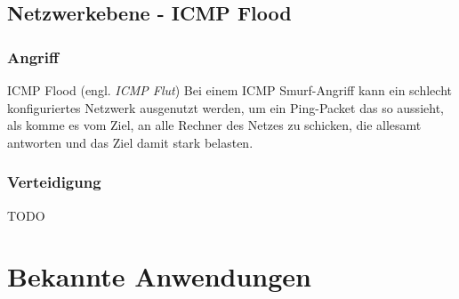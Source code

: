 \documentclass[12pt,a4paper]{article}
\begin{document}
\subsection{Netzwerkebene - ICMP Flood}
\subsubsection*{Angriff}
ICMP Flood (engl. \textit{ICMP Flut}) Bei einem ICMP Smurf-Angriff kann ein schlecht konfiguriertes Netzwerk ausgenutzt werden, um ein Ping-Packet das so aussieht, als komme es vom Ziel, an alle Rechner des Netzes zu schicken, die allesamt antworten und das Ziel damit stark belasten.
\subsubsection*{Verteidigung}
TODO
\section{Bekannte Anwendungen}
\end{document}
